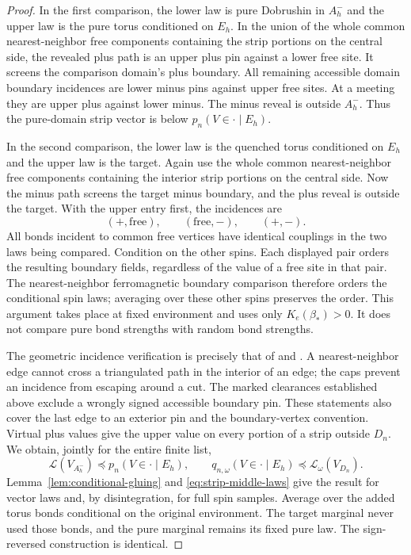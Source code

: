 \begin{proof}
In the first comparison, the lower law is pure Dobrushin in $A_h^-$
and the upper law is the pure torus conditioned on $E_h$.  In the
union of the whole common nearest-neighbor free components containing
the strip portions on the central side, the revealed plus path
is an upper plus pin against a lower free site.  It screens the
comparison domain's plus boundary.  All remaining accessible domain
boundary incidences are lower minus pins against upper free sites.
At a meeting they are upper plus against lower minus.  The minus
reveal is outside $A_h^-$.  Thus the pure-domain strip vector is
below $p_n(V\in\cdot\mid E_h)$.

In the second comparison, the lower law is the quenched torus
conditioned on $E_h$ and the upper law is the target.  Again use the
whole common nearest-neighbor free components containing the interior
strip portions on the central side.  Now the minus
path screens the target minus boundary, and the plus reveal is
outside the target.  With the upper entry first, the incidences are
\[
 (+,\mathrm{free}),\qquad (\mathrm{free},-),\qquad (+,-).
\]
All bonds incident to common free vertices have identical couplings
in the two laws being compared.  Condition on the other spins.
Each displayed pair orders the resulting boundary fields, regardless
of the value of a free site in that pair.  The nearest-neighbor
ferromagnetic boundary comparison therefore orders the conditional
spin laws; averaging over these other spins preserves the order.
This argument takes place at fixed environment and uses only
$K_e(\beta_*)>0$.  It does not compare pure bond strengths with
random bond strengths.

The geometric incidence verification is precisely that of
\cite[Section~9, proof of ``Quenched transfer of a finite strip
family'']{R} and \cite[Section~7, proof of ``Fixed-geometry boundary
squeeze'']{S}.  A nearest-neighbor edge cannot cross a triangulated
path in the interior of an edge; the caps prevent an incidence from
escaping around a cut.  The marked clearances established above
exclude a wrongly signed accessible boundary pin.  These statements
also cover the last edge to an exterior pin and the boundary-vertex
convention.  Virtual plus values give the upper value on every
portion of a strip outside $D_n$.  We obtain, jointly for the entire
finite list,
\[
 \mathcal L(V_{A_h^-})\preceq p_n(V\in\cdot\mid E_h),\qquad
 q_{n,\omega}(V\in\cdot\mid E_h)\preceq\mathcal L_\omega(V_{D_n}).
\]
Lemma~\ref{lem:conditional-gluing} and
\eqref{eq:strip-middle-laws} give the result for vector laws and,
by disintegration, for full spin samples.  Average over the added
torus bonds conditional on the original environment.  The target
marginal never used those bonds, and the pure marginal remains its
fixed pure law.  The sign-reversed construction is identical.
\end{proof}

